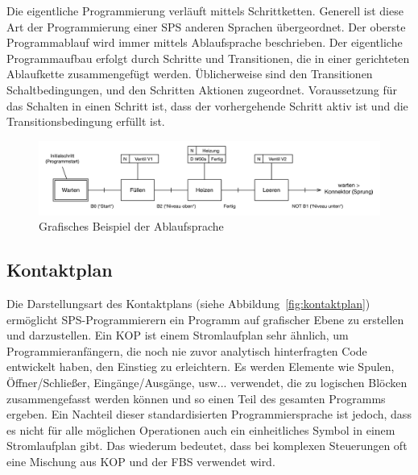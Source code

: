 	Die eigentliche Programmierung verläuft mittels Schrittketten. Generell ist diese Art der Programmierung einer \ac{SPS} anderen Sprachen übergeordnet. Der oberste Programmablauf wird immer mittels Ablaufsprache beschrieben. Der eigentliche Programmaufbau erfolgt durch Schritte und Transitionen, die in einer gerichteten Ablaufkette zusammengefügt werden. Üblicherweise sind den Transitionen Schaltbedingungen, und den Schritten Aktionen zugeordnet. Voraussetzung für das Schalten in einen Schritt ist, dass der vorhergehende Schritt aktiv ist und die Transitionsbedingung erfüllt ist.\\

	\begin{figure}[h!]
  		\centering
    	\includegraphics[width=1\textwidth]{graphics/stateoftheart/as.png}
  		\caption{Grafisches Beispiel der Ablaufsprache \cite{indsteu}}
  		\label{fig:as}
	\end{figure}
	
	
	
	\subsection{Kontaktplan}
	Die Darstellungsart des Kontaktplans (siehe Abbildung~\ref{fig:kontaktplan}) ermöglicht \ac{SPS}-Programmierern ein Programm auf grafischer Ebene zu erstellen und darzustellen. Ein \ac{KOP} ist einem Stromlaufplan sehr ähnlich, um Programmieranfängern, die noch nie zuvor analytisch hinterfragten Code entwickelt haben, den Einstieg zu erleichtern. Es werden Elemente wie Spulen, Öffner/Schließer, Eingänge/Ausgänge, usw... verwendet, die zu logischen Blöcken zusammengefasst werden können und so einen Teil des gesamten Programms ergeben. Ein Nachteil dieser standardisierten Programmiersprache ist jedoch, dass es nicht für alle möglichen Operationen auch ein einheitliches Symbol in einem Stromlaufplan gibt. Das wiederum bedeutet, dass bei komplexen Steuerungen oft eine Mischung aus \ac{KOP} und der \ac{FBS} verwendet wird.\\

